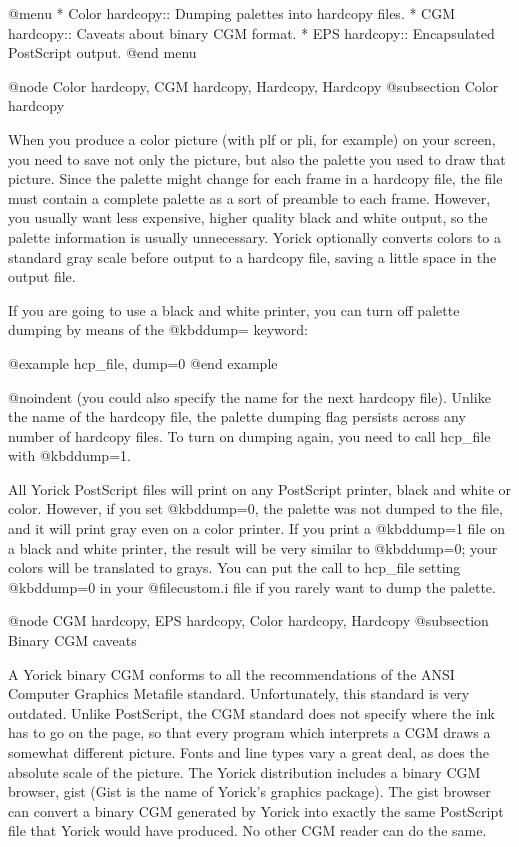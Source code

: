 @menu
* Color hardcopy::              Dumping palettes into hardcopy files.
* CGM hardcopy::                Caveats about binary CGM format.
* EPS hardcopy::                Encapsulated PostScript output.
@end menu

@node Color hardcopy, CGM hardcopy, Hardcopy, Hardcopy
@subsection Color hardcopy

When you produce a color picture (with plf or pli, for example) on your
screen, you need to save not only the picture, but also the palette you
used to draw that picture.  Since the palette might change for each
frame in a hardcopy file, the file must contain a complete palette as a
sort of preamble to each frame.  However, you usually want less
expensive, higher quality black and white output, so the palette
information is usually unnecessary.  Yorick optionally converts colors
to a standard gray scale before output to a hardcopy file, saving a
little space in the output file.

If you are going to use a black and white printer, you can turn off
palette dumping by means of the @kbd{dump=} keyword:

@example
hcp_file, dump=0
@end example

@noindent
(you could also specify the name for the next hardcopy file).  Unlike
the name of the hardcopy file, the palette dumping flag persists across
any number of hardcopy files.  To turn on dumping again, you need to
call hcp_file with @kbd{dump=1}.

All Yorick PostScript files will print on any PostScript printer, black
and white or color.  However, if you set @kbd{dump=0}, the palette was
not dumped to the file, and it will print gray even on a color printer.
If you print a @kbd{dump=1} file on a black and white printer, the
result will be very similar to @kbd{dump=0}; your colors will be
translated to grays.  You can put the call to hcp_file setting
@kbd{dump=0} in your @file{custom.i} file if you rarely want to dump the
palette.

@node CGM hardcopy, EPS hardcopy, Color hardcopy, Hardcopy
@subsection Binary CGM caveats

A Yorick binary CGM conforms to all the recommendations of the ANSI
Computer Graphics Metafile standard.  Unfortunately, this standard is
very outdated.  Unlike PostScript, the CGM standard does not specify
where the ink has to go on the page, so that every program which
interprets a CGM draws a somewhat different picture.  Fonts and line
types vary a great deal, as does the absolute scale of the picture.
The Yorick distribution includes a binary CGM browser, gist (Gist is
the name of Yorick's graphics package).  The gist browser can convert
a binary CGM generated by Yorick into exactly the same PostScript file
that Yorick would have produced.  No other CGM reader can do the
same.

